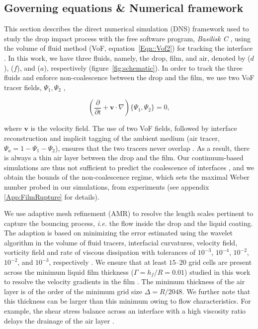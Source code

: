 \documentclass[]{jfm}
\begin{document}
	\subsection{Governing equations \& Numerical framework}
	\label{subsec:numerical methods}
	This section describes the direct numerical simulation (DNS) framework used to study the drop impact process with the free software program, \emph{Basilisk C} \citep{popinet-basilisk}, using the volume of fluid method (VoF, equation~\eqref{Eqn::Vof2}) for tracking the interface \citep{tryggvason2011direct}. In this work, we have three fluids, namely, the drop, film, and air, denoted by ($d$), ($f$), and ($a$), respectively (figure~\ref{fig:schematic}). In order to track the three fluids and enforce non-coalescence between the drop and the film, we use two VoF tracer fields, $\Psi_1, \Psi_2$ \citep{ramirezsoto-2020-sciadv},
	
	\begin{equation}
		\label{Eqn::Vof2}
		\left(\frac{\partial}{\partial t} + \boldsymbol{v\cdot}\nabla\right)\{\Psi_1, \Psi_2\} = 0,
	\end{equation}
	
	\noindent where $\boldsymbol{v}$ is the velocity field. 
	The use of two VoF fields, followed by interface reconstruction and implicit tagging of the ambient medium (air tracer, $\Psi_a = 1 - \Psi_1 - \Psi_2$), ensures that the two tracers never overlap \citep{ramirezsoto-2020-sciadv, naru2021numerical}. As a result, there is always a thin air layer between the drop and the film. Our continuum-based simulations are thus not sufficient to predict the coalescence of interfaces \citep{SprittlesPhysRevLett.124.084501},
	and we obtain the bounds of the non-coalescence regime, which sets the maximal Weber number probed in our simulations, from experiments (see appendix \ref{App:FilmRupture} for details).
	
	We use adaptive mesh refinement (AMR) to resolve the length scales pertinent to capture the bouncing process, \emph{i.e.} the flow inside the drop and the liquid coating.
	The adaption is based on minimizing the error estimated using the wavelet algorithm \citep{popinet-2015-jcp} in the volume of fluid tracers, interfacial curvatures, velocity field, vorticity field and rate of viscous dissipation with tolerances of $10^{-3}$, $10^{-4}$, $10^{-2}$, $10^{-2}$, and $10^{-3}$, respectively  \citep{basiliskVatsalDropFilm}. 
	We ensure that at least $15$--$20$ grid cells are present across the minimum liquid film thickness ($\Gamma = h_f/R = 0.01$) studied in this work to resolve the velocity gradients in the film \citep{josserand2016droplet, ling2017spray}. 
	The minimum thickness of the air layer is of the order of the minimum grid size $\Delta = R/2048$. We further note that this thickness can be larger than this minimum owing to flow characteristics. For example, the shear stress balance across an interface with a high viscosity ratio delays the drainage of the air layer \citep{zhang_ni_magnaudet_2021}.  
	
\end{document}
